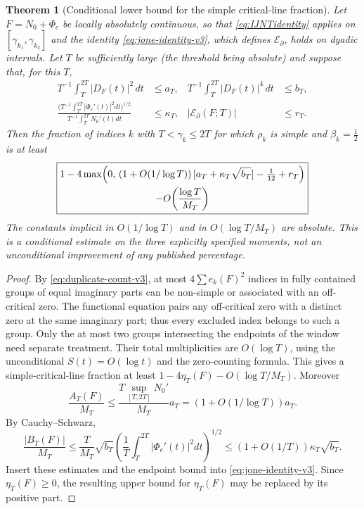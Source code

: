 \documentclass[11pt,a4paper]{article}
\numberwithin{equation}{section}
\newtheorem{theorem}{Theorem}[section]
\theoremstyle{definition}
\theoremstyle{remark}
\begin{document}
\begin{theorem}[Conditional lower bound for the simple critical-line fraction]\label{thm:conditional-proportion-v3}
Let $F=N_0+\Phi_c$ be locally absolutely continuous, so that \eqref{eq:IJNTidentity} applies on $[\gamma_{k_1},\gamma_{k_2}]$ and the identity \eqref{eq:jone-identity-v3}, which defines $\mathcal E_\partial$, holds on dyadic intervals.
Let $T$ be sufficiently large (the threshold being absolute) and suppose that, for this $T$,
\begin{equation}\label{eq:jone-input-v3}
\begin{aligned}
T^{-1}\int_T^{2T}|D_F(t)|^2\,dt&\le a_T,&
T^{-1}\int_T^{2T}|D_F(t)|^4\,dt&\le b_T,\\
\frac{\bigl(T^{-1}\int_T^{2T}|\Phi_c'(t)|^2dt\bigr)^{1/2}}
{T^{-1}\int_T^{2T}N_0'(t)dt}&\le\kappa_T,&
|\mathcal E_{\partial}(F;T)|&\le r_T.
\end{aligned}
\end{equation}
Then the fraction of indices $k$ with $T<\gamma_k\le2T$
for which $\rho_k$ is simple and $\beta_k=\tfrac12$ is at least
\begin{equation}\label{eq:jone-fraction-v3}
\boxed{\begin{gathered}
1-4\max\Bigl(0,\,(1+O(1/\log T))\,[a_T+\kappa_T\sqrt{b_T}]
-\tfrac1{12}+r_T\Bigr)\\
-O\!\left(\frac{\log T}{M_T}\right)
\end{gathered}}
\end{equation}
The constants implicit in $O(1/\log T)$ and in $O(\log T/M_T)$ are absolute. This is a
\emph{conditional estimate on the three explicitly specified moments},
not an unconditional improvement of any published percentage.
\end{theorem}
\begin{proof}
By \eqref{eq:duplicate-count-v3}, at most $4\sum e_k(F)^2$
indices in fully contained groups of equal imaginary parts can be
non-simple or associated with an off-critical zero. The functional
equation pairs any off-critical zero with a distinct zero at the same
imaginary part; thus every excluded index belongs to such a group.
Only the at most two groups intersecting the endpoints of the window
need separate treatment. Their total multiplicities are $O(\log T)$,
using the unconditional $S(t)=O(\log t)$ and the zero-counting formula.
This gives a simple-critical-line fraction at least
$1-4\eta_T(F)-O(\log T/M_T)$.
Moreover
\begin{equation}
\frac{A_T(F)}{M_T}\le
\frac{T\sup_{[T,2T]}N_0'}{M_T}a_T
=(1+O(1/\log T))a_T.
\end{equation}
By Cauchy--Schwarz,
\begin{equation}
\frac{|B_T(F)|}{M_T}
\le \frac{T}{M_T}\sqrt{b_T}\left(\frac1T
\int_T^{2T}|\Phi_c'(t)|^2dt\right)^{1/2}
\le(1+O(1/T))\kappa_T\sqrt{b_T}.
\end{equation}
Insert these estimates and the endpoint bound into
\eqref{eq:jone-identity-v3}. Since $\eta_T(F)\ge0$, the resulting upper
bound for $\eta_T(F)$ may be replaced by its positive part.
\end{proof}
\end{document}
